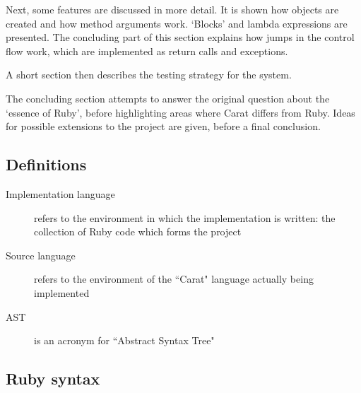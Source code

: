 Next, some features are discussed in more detail. It is shown how objects are created and how method arguments work. `Blocks' and lambda expressions are presented. The concluding part of this section explains how jumps in the control flow work, which are implemented as return calls and exceptions.

A short section then describes the testing strategy for the system.

The concluding section attempts to answer the original question about the `essence of Ruby', before highlighting areas where Carat differs from Ruby. Ideas for possible extensions to the project are given, before a final conclusion.

\subsection{Definitions}

\begin{description}
	\item[Implementation language] refers to the environment in which the implementation is written: the collection of Ruby code which forms the project
	\item[Source language] refers to the environment of the ``Carat" language actually being implemented
	\item[AST] is an acronym for ``Abstract Syntax Tree"
\end{description}

\subsection{Ruby syntax}


